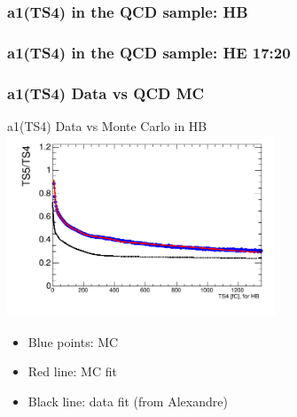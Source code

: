 \documentclass[bigger]{beamer}
\begin{document}
\begin{frame}
\frametitle{a1(TS4) in the QCD sample: HB}
\label{sec-3-5-2}
\label{sec-3-5-2-1}

\begin{center}
\resizebox*{!}{0.75\textheight}{

}
\end{center}
\end{frame}
\begin{frame}
\frametitle{a1(TS4) in the QCD sample: HE 17:20}
\label{sec-3-5-3}
\label{sec-3-5-3-1}

\begin{center}
\resizebox*{!}{0.75\textheight}{

}
\end{center}
\end{frame}
\begin{frame}
\frametitle{a1(TS4) Data vs QCD MC}
\label{sec-3-5-4}
\label{sec-3-5-4-1}

\centering
a1(TS4) Data vs Monte Carlo in HB
\includegraphics[width=0.6\textwidth]{fig/a1_ring0_daata.png}
\label{sec-3-5-4-2}
\begin{itemize}

\item Blue points: MC
\label{sec-3-5-4-2-1}%

\item Red line: MC fit
\label{sec-3-5-4-2-2}%

\item Black line: data fit (from Alexandre)
\label{sec-3-5-4-2-3}%
\end{itemize} %
\end{frame}
\end{document}
